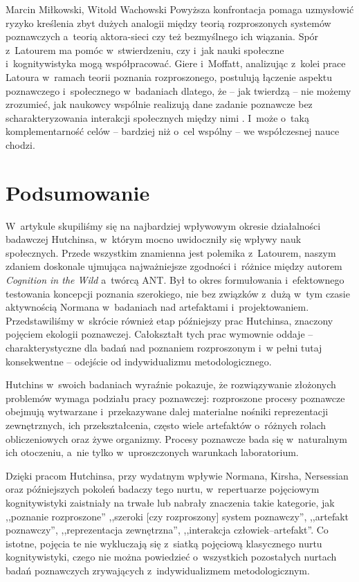 \begin{artplenv2auth}{Marcin Miłkowski, Witold Wachowski}
Powyższa konfrontacja pomaga uzmysłowić ryzyko kreślenia zbyt dużych analogii między teorią rozproszonych systemów poznawczych a~teorią aktora-sieci czy też bezmyślnego ich wiązania. Spór z~Latourem ma pomóc w~stwierdzeniu, czy i~jak nauki społeczne i~kognitywistyka mogą współpracować. Giere i~Moffatt, analizując z~kolei prace Latoura w~ramach teorii poznania rozproszonego, postulują łączenie aspektu poznawczego i~społecznego w~badaniach dlatego, że -- jak twierdzą -- nie możemy zrozumieć, jak naukowcy wspólnie realizują dane zadanie poznawcze bez scharakteryzowania interakcji społecznych między nimi
\parencite[][s.~4–8]{giere_distributed_2003}. %
 I~może o~taką komplementarność celów -- bardziej niż o~cel wspólny -- we współczesnej nauce chodzi.

\section{Podsumowanie}

W~artykule skupiliśmy się na najbardziej wpływowym okresie działalności badawczej Hutchinsa, w~którym mocno uwidoczniły się wpływy nauk społecznych. Przede wszystkim znamienna jest polemika z~La\-tourem, naszym zdaniem doskonale ujmująca najważniejsze zgodności i~różnice między autorem \textit{Cognition in the Wild} a~twórcą ANT. Był to okres formułowania i~efektownego testowania koncepcji poznania szerokiego, nie bez związków z~dużą w~tym czasie aktywnością Normana w~badaniach nad artefaktami i~projektowaniem. Przedstawiliśmy w~skrócie również etap późniejszy prac Hutchinsa, znaczony pojęciem ekologii poznawczej. Całokształt tych prac wymownie oddaje -- charakterystyczne dla badań nad poznaniem rozproszonym i~w pełni tutaj konsekwentne -- odejście od indywidualizmu metodologicznego.

Hutchins w~swoich badaniach wyraźnie pokazuje, że rozwiązywanie złożonych problemów wymaga podziału pracy poznawczej: rozproszone procesy poznawcze obejmują wytwarzane i~przekazywane dalej materialne nośniki reprezentacji zewnętrznych, ich przekształcenia, często wiele artefaktów o~różnych rolach obliczeniowych oraz żywe organizmy. Procesy poznawcze bada się w~naturalnym ich otoczeniu, a~nie tylko w~uproszczonych warunkach laboratorium.

Dzięki pracom Hutchinsa, przy wydatnym wpływie Normana, Kirsha, Nersessian oraz późniejszych pokoleń badaczy tego nurtu, w~repertuarze pojęciowym kognitywistyki zaistniały na trwałe lub nabrały znaczenia takie kategorie, jak ,,poznanie rozproszone'' ,,szeroki [czy rozproszony] system poznawczy'', ,,artefakt poznawczy'', ,,reprezentacja zewnętrzna'', ,,interakcja człowiek–artefakt''. Co istotne, pojęcia te nie wykluczają się z~siatką pojęciową klasycznego nurtu kognitywistyki, czego nie można powiedzieć o~wszystkich pozostałych nurtach badań poznawczych zrywających z~indywidualizmem metodologicznym.


\end{artplenv2auth}
